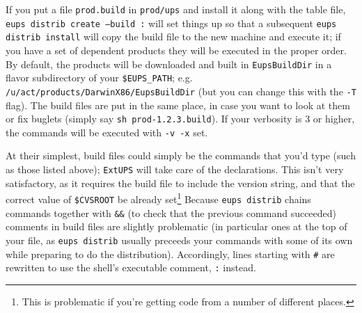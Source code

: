 \documentclass{article}
\newcommand{\code}[1]{\texttt{#1}}
\newcommand{\eups}{\code{ExtUPS}\xspace}
\begin{document}
If you put a file \code{prod.build} in \code{prod/ups} and install it along
with the table file, \code{eups distrib create --build :} will set things up
so that a subsequent \code{eups distrib install} will copy the build file
to the new machine and execute it;  if you have a set of dependent products
they will be executed in the proper order.  By default, the products will be downloaded
and built in \code{EupsBuildDir} in a flavor subdirectory of your \code{\$EUPS\_PATH};
e.g. \code{/u/act/products/DarwinX86/EupsBuildDir} (but you can change this with
the \code{-T} flag). The build files are put in the same place, in case you want
to look at them or fix buglets (simply say \code{sh prod-1.2.3.build}).  If your
verbosity is 3 or higher, the commands will be executed with \code{-v -x} set.

At their simplest, build files could simply
be the commands that you'd type (such as those listed above); \eups will take
care of the declarations.  This isn't very satisfactory, as it requires the
build file to include the version string, and that the correct value of \code{\$CVSROOT}
be already set\footnote{This is problematic if you're getting code from a number
  of different places.}
Because \code{eups distrib} chains commands together with \code{\&\&} (to check
that the previous command succeeded) comments in build files are slightly
problematic (in particular ones at the top of your file, as \code{eups distrib}
usually preceeds your commands with some of its own while preparing to do
the distribution).  Accordingly, lines starting with \code{\#} are rewritten
to use the shell's executable comment, \code{:} instead.
\end{document}
